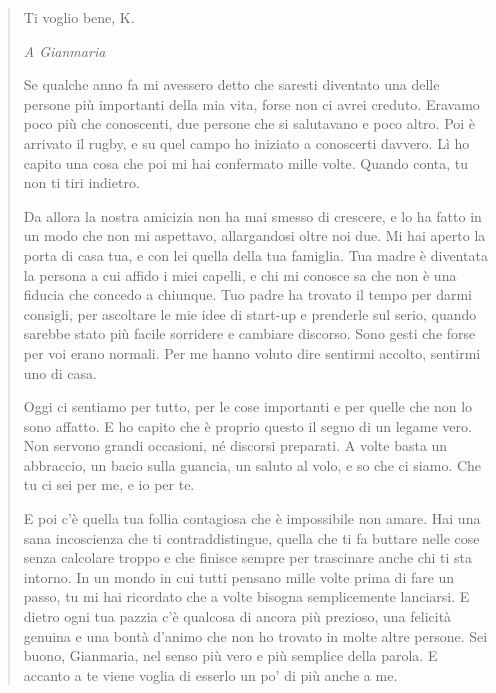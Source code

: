 \begin{quote}
Ti voglio bene, K.\par

\clearpage
\vspace{5mm}
\textit{A Gianmaria}\par
\vspace{2mm}
Se qualche anno fa mi avessero detto che saresti diventato una delle persone più importanti della mia vita, forse non ci avrei creduto. Eravamo poco più che conoscenti, due persone che si salutavano e poco altro. Poi è arrivato il rugby, e su quel campo ho iniziato a conoscerti davvero. Lì ho capito una cosa che poi mi hai confermato mille volte. Quando conta, tu non ti tiri indietro.\par

Da allora la nostra amicizia non ha mai smesso di crescere, e lo ha fatto in un modo che non mi aspettavo, allargandosi oltre noi due. Mi hai aperto la porta di casa tua, e con lei quella della tua famiglia. Tua madre è diventata la persona a cui affido i miei capelli, e chi mi conosce sa che non è una fiducia che concedo a chiunque. Tuo padre ha trovato il tempo per darmi consigli, per ascoltare le mie idee di start-up e prenderle sul serio, quando sarebbe stato più facile sorridere e cambiare discorso. Sono gesti che forse per voi erano normali. Per me hanno voluto dire sentirmi accolto, sentirmi uno di casa.\par

Oggi ci sentiamo per tutto, per le cose importanti e per quelle che non lo sono affatto. E ho capito che è proprio questo il segno di un legame vero. Non servono grandi occasioni, né discorsi preparati. A volte basta un abbraccio, un bacio sulla guancia, un saluto al volo, e so che ci siamo. Che tu ci sei per me, e io per te.\par

E poi c'è quella tua follia contagiosa che è impossibile non amare. Hai una sana incoscienza che ti contraddistingue, quella che ti fa buttare nelle cose senza calcolare troppo e che finisce sempre per trascinare anche chi ti sta intorno. In un mondo in cui tutti pensano mille volte prima di fare un passo, tu mi hai ricordato che a volte bisogna semplicemente lanciarsi. E dietro ogni tua pazzia c'è qualcosa di ancora più prezioso, una felicità genuina e una bontà d'animo che non ho trovato in molte altre persone. Sei buono, Gianmaria, nel senso più vero e più semplice della parola. E accanto a te viene voglia di esserlo un po' di più anche a me.\par


\end{quote}
